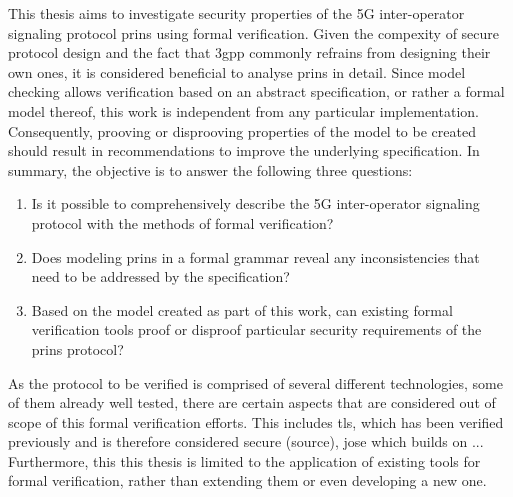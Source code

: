 This thesis aims to investigate security properties of the 5G inter-operator signaling protocol \gls{prins} using formal verification.
Given the compexity of secure protocol design and the fact that \gls{3gpp} commonly refrains from designing their own ones, it is considered beneficial to analyse \gls{prins} in detail.
Since model checking allows verification based on an abstract specification, or rather a formal model thereof, this work is independent from any particular implementation.
Consequently, prooving or disprooving properties of the model to be created should result in recommendations to improve the underlying specification.
In summary, the objective is to answer the following three questions:

\begin{enumerate}[label=(\arabic*)]
    \item Is it possible to comprehensively describe the 5G inter-operator signaling protocol with the methods of formal verification?

    \item Does modeling \gls{prins} in a formal grammar reveal any inconsistencies that need to be addressed by the specification?

    \item Based on the model created as part of this work, can existing formal verification tools proof or disproof particular security requirements of the \gls{prins} protocol?
\end{enumerate}

As the protocol to be verified is comprised of several different technologies, some of them already well tested, there are certain aspects that are considered out of scope of this formal verification efforts.
This includes \gls{tls}, which has been verified previously and is therefore considered secure (source), \gls{jose} which builds on ...
Furthermore, this this thesis is limited to the application of existing tools for formal verification, rather than extending them or even developing a new one.
